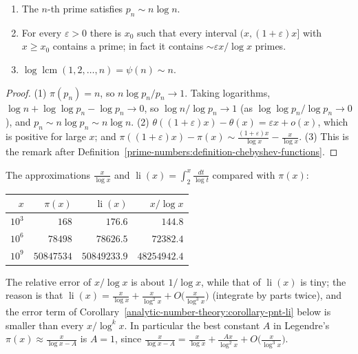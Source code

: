 \begin{corollary}\label{analytic-number-theory:corollary-pnt}
\begin{enumerate}
\item The $n$-th prime satisfies $p_n \sim n\log n$.
\item For every $\varepsilon > 0$ there is $x_0$ such that every interval $(x, (1 + \varepsilon)x]$ with $x \geq x_0$ contains a prime; in fact it contains $\sim\varepsilon x/\log x$ primes.
\item $\log\operatorname{lcm}(1, 2, \ldots, n) = \psi(n) \sim n$.
\end{enumerate}
\end{corollary}

\begin{proof}
(1) $\pi(p_n) = n$, so $n\log p_n/p_n \to 1$. Taking logarithms, $\log n + \log\log p_n - \log p_n \to 0$, so $\log n/\log p_n \to 1$ (as $\log\log p_n/\log p_n \to 0$), and
$p_n \sim n\log p_n \sim n\log n$. (2) $\theta((1 + \varepsilon)x) - \theta(x) = \varepsilon x + o(x)$, which is positive for large $x$; and $\pi((1 + \varepsilon)x) - \pi(x) \sim \frac{(1 + \varepsilon)x}{\log x} - \frac{x}{\log x}$.
(3) This is the remark after Definition~\ref{prime-numbers:definition-chebyshev-functions}.
\end{proof}

\begin{example}\label{analytic-number-theory:example-pnt-table}
The approximations $\frac{x}{\log x}$ and $\operatorname{li}(x) = \int_2^x\frac{dt}{\log t}$ compared with $\pi(x)$:
\begin{center}
\begin{tabular}{rrrr}
$x$ & $\pi(x)$ & $\operatorname{li}(x)$ & $x/\log x$ \\
\hline
$10^3$ & $168$ & $176.6$ & $144.8$ \\
$10^6$ & $78498$ & $78626.5$ & $72382.4$ \\
$10^9$ & $50847534$ & $50849233.9$ & $48254942.4$
\end{tabular}
\end{center}
The relative error of $x/\log x$ is about $1/\log x$, while that of $\operatorname{li}(x)$ is tiny; the reason is that $\operatorname{li}(x) = \frac{x}{\log x} + \frac{x}{\log^2x} + O\bigl(\frac{x}{\log^3x}\bigr)$
(integrate by parts twice), and the error term of Corollary~\ref{analytic-number-theory:corollary-pnt-li} below is smaller than every $x/\log^kx$. In particular the best constant $A$ in Legendre's
$\pi(x) \approx \frac{x}{\log x - A}$ is $A = 1$, since $\frac{x}{\log x - A} = \frac{x}{\log x} + \frac{Ax}{\log^2x} + O\bigl(\frac{x}{\log^3x}\bigr)$.
\end{example}

